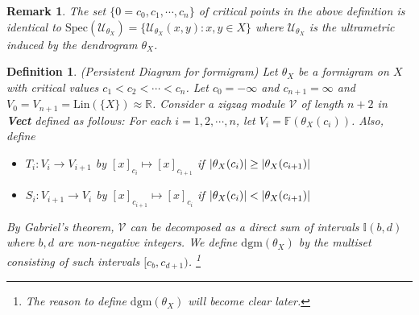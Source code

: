 \documentclass[a4paper,12pt]{article}
\newtheorem{remark}{Remark}[section]
\newtheorem{definition}{Definition}[section]
\newcommand{\woojin}[1]           {{ \textcolor{darkblue} {#1}}}
\newcommand{\dgm}{\mathrm{dgm}}
\DeclarePairedDelimiter{\abs}{\lvert}{\rvert}
\begin{document}
\begin{remark} The set $\{0=c_0, c_1, \cdots, c_n\}$ of critical points in the above definition is identical to $\mathrm{Spec}(\mathcal{U}_{\theta_X})=\{\mathcal{U}_{\theta_X}(x,y): x,y\in X\}$ where $\mathcal{U}_{\theta_X}$ is the ultrametric induced by the dendrogram $\theta_X$.

\end{remark}

\begin{definition}(Persistent Diagram for formigram) Let $\theta_X$ be a formigram on $X$ with critical values $c_1< c_2< \cdots <c_n$. Let $c_0=-\infty$ and $c_{n+1}=\infty$ and $V_{0}=V_{n+1}=\mathrm{Lin}(\{X\})\approx \mathbb{R}$. Consider a zigzag module $\mathcal{V}$ of length $n+2$ in \textbf{Vect} defined as follows: For each $i=1, 2,\cdots, n$, let $V_i=\mathbb{F}(\theta_X(c_i))$. Also, define  
\begin{itemize}
\item[] $T_{i}:V_{i}\rightarrow V_{i+1}$ by $[x]_{c_{i}}\mapsto [x]_{c_{i+1}}$ if $\abs{\theta_X(c_{i})}\geq\abs{\theta_X(c_{i+1})}$

\item[] $S_{i}:V_{i+1}\rightarrow V_{i}$ by $[x]_{c_{i+1}}\mapsto [x]_{c_{i}}$ if $\abs{\theta_X(c_{i})}<\abs{\theta_X(c_{i+1})}$

\end{itemize}
By Gabriel's theorem, $\mathcal{V}$ can be decomposed as a direct sum of intervals $\mathbb{I}(b,d)$ where $b,d$ are non-negative integers. We define $\dgm(\theta_X)$ by the multiset consisting of such intervals $[c_b,c_{d+1})$. \label{diagram} \footnote{The reason to define $\dgm(\theta_X)$ will become clear later.}
\end{definition}


\end{document}

